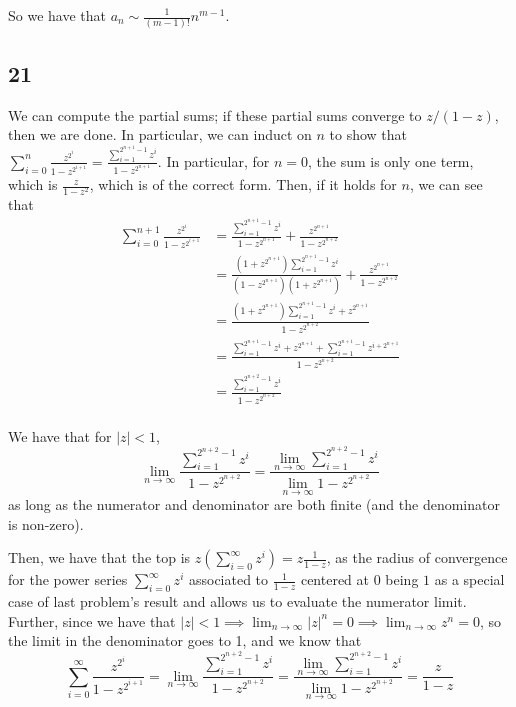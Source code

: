 \documentclass[12pt,letterpaper]{article}
\theoremstyle{definition}
\begin{document}
So we have that $a_{n} \sim \frac{1}{(m-1)!}n^{m-1}$.

\subsection*{21}

We can compute the partial sums; if these partial sums converge to $z / (1-z)$, then we are done. In particular, we can induct on $n$ to show that $\sum_{i=0}^{n}\frac{z^{2^{i}}}{1-z^{2^{i+1}}} = \frac{\sum_{i=1}^{2^{n+1}-1}z^{i}}{1-z^{2^{n+1}}}$. In particular, for $n = 0$, the sum is only one term, which is $\frac{z}{1-z^{2}}$, which is of the correct form. Then, if it holds for $n$, we can see that
\begin{align*}
  \sum_{i=0}^{n+1}\frac{z^{2^{i}}}{1-z^{2^{i+1}}} &=  \frac{\sum_{i=1}^{2^{n+1}-1}z^{i}}{1-z^{2^{n+1}}} + \frac{z^{2^{n+1}}}{1 - z^{2^{n+2}}}\\
                                                  &=  \frac{(1+z^{2^{n+1}})\sum_{i=1}^{2^{n+1}-1}z^{i}}{(1-z^{2^{n+1}})(1+z^{2^{n+1}})} + \frac{z^{2^{n+1}}}{1 - z^{2^{n+2}}}\\
                                                  &= \frac{(1+z^{2^{n+1}})\sum_{i=1}^{2^{n+1}-1}z^{i}+z^{2^{n+1}}}{1-z^{2^{n+2}}} \\
                                                  &= \frac{\sum_{i=1}^{2^{n+1}-1}z^{i} +z^{2^{n+1}}+ \sum_{i=1}^{2^{n+1}-1}z^{i+2^{n+1}}}{1-z^{2^{n+2}}} \\
                                                  &= \frac{\sum_{i=1}^{2^{n+2}-1}z^{i}}{1-z^{2^{n+2}}} \\
\end{align*}

We have that for $|z| < 1$,
\[
  \lim_{n \rightarrow\infty}\frac{\sum_{i=1}^{2^{n+2}-1}z^{i}}{1-z^{2^{n+2}}} = \frac{\lim_{n \rightarrow\infty} \sum_{i=1}^{2^{n+2}-1}z^{i}}{\lim_{n \rightarrow \infty}1-z^{2^{n+2}}}
\]
as long as the numerator and denominator are both finite (and the denominator is non-zero).

Then, we have that the top is $z(\sum_{i=0}^{\infty}z^{i}) = z\frac{1}{1-z}$, as the radius of convergence for the power series $\sum_{i=0}^{\infty} z^{i}$ associated to $\frac{1}{1-z}$ centered at $0$ being $1$ as a special case of last problem's result and allows us to evaluate the numerator limit. Further, since we have that $|z| < 1 \implies \lim_{n \rightarrow\infty}|z|^{n} = 0 \implies \lim_{n \rightarrow \infty} z^{n} = 0$, so the limit in the denominator goes to 1, and we know that
\[
  \sum_{i=0}^{\infty}\frac{z^{2^{i}}}{1-z^{2^{i+1}}} =
  \lim_{n \rightarrow\infty}\frac{\sum_{i=1}^{2^{n+2}-1}z^{i}}{1-z^{2^{n+2}}} = \frac{\lim_{n \rightarrow\infty} \sum_{i=1}^{2^{n+2}-1}z^{i}}{\lim_{n \rightarrow \infty}1-z^{2^{n+2}}} = \frac{z}{1-z}
\]
\end{document}
